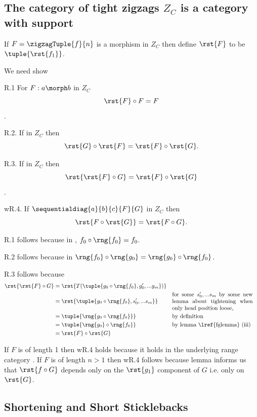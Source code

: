 \subsection{The category of tight zigzags $Z_C$ is a category with support}

If $F=\zigzagTuple{f}{n}$ is a morphism in $Z_C$ then define $\rst{F}$ to be $\tuple{\rst{f_1}}$.

We need show

R.1 For $F:a \morph b$ in $Z_C$ $$\rst{F} \circ F =F$$.

R.2. If \FGsourcediag in $Z_C$ then
$$\rst{G} \circ \rst{F}=\rst{F} \circ \rst{G}.$$

R.3. If \FGsourcediag in $Z_C$ then
$$\rst{\rst{F} \circ G} = \rst{F} \circ \rst{G}$$.

wR.4. If $\sequentialdiag{a}{b}{c}{F}{G}$ in $Z_C$ then
\[
\rst{F \circ \rst{G}} = \rst{F \circ G}.
\]

R.1 follows because in \catcw, $f_0 \circ \rng{f_0} = f_0$. 

R.2 follows because in \catcw $\rng{f_0} \circ \rng{g_0} = \rng{g_0} \circ \rng{f_0}$.

R.3 follows because
\begin{align*}
\rst{\rst{F} \circ G} 
                   &= \rst{T(\tuple{g_0 \circ \rng{f_0},g'_0,...g_m})}\\
                   &= \rst{\tuple{g_0 \circ \rng{f_0},s'_0,...s_m}}
                                             &&\mbox{\parbox{5cm}{for some $s'_0,...s_m$
                                                       by some new lemma about tightening when only head position loose,}}\\
                   &=\tuple{\rng{g_0 \circ \rng{f_0}}} 
                                            && \mbox{by definition}\\
                   &=\tuple{\rng{g_0} \circ \rng{f_0}}  
                                            && \mbox{by lemma \lref{fglemma} (iii)}\\
                   &=\rst{F} \circ \rst{G}      
\end{align*}

If $F$ is of length 1 then wR.4 holds because
it holds in the underlying range category \catcw. 
If $F$ is of length $n > 1$ then wR.4 follows because lemma
 informs us that $\rst{f \circ G}$ depends only on the $\rst{g_1}$ component of $G$ i.e. only on $\rst{G}$.


\subsection{Shortening and Short Sticklebacks}

